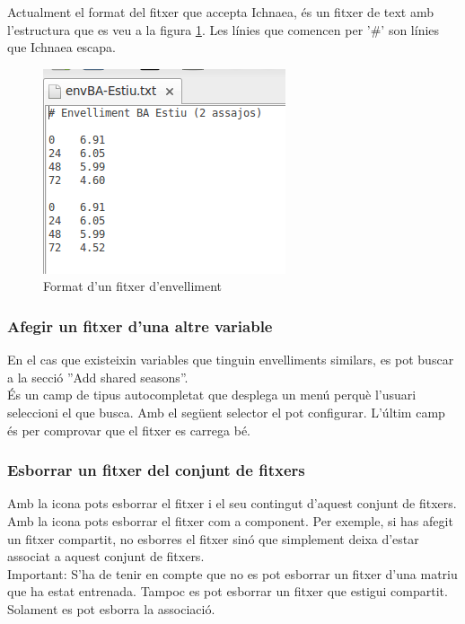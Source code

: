 Actualment el format del fitxer que accepta Ichnaea, \'{e}s un fitxer de text amb l'estructura que es veu a la figura \ref{fig:envelliment}. Les línies que comencen per '\#' son línies que Ichnaea escapa.

\begin{figure}[h!]
  \centering
  \includegraphics[scale=0.5]{img/userguide/envelliment.png}
  \caption{Format d'un fitxer d'envelliment}
  \label{fig:envelliment}
\end{figure}

\subsubsection{Afegir un fitxer d'una altre variable}
En el cas que existeixin variables que tinguin envelliments similars, es pot buscar a la secció ''Add shared seasons''.\\

\'{E}s un camp de tipus autocompletat que desplega un menú perquè l'usuari seleccioni el que busca. Amb el següent selector el pot configurar. L'\'{u}ltim camp \'{e}s per comprovar que el fitxer es carrega b\'{e}.

\subsubsection{Esborrar un fitxer del conjunt de fitxers}
Amb la icona \icontrash pots esborrar el fitxer i el seu contingut d'aquest conjunt de fitxers.\\

Amb la icona \iconremove pots esborrar el fitxer com a component. Per exemple, si has afegit un fitxer compartit, no esborres el fitxer sinó que simplement deixa d'estar associat a aquest conjunt de fitxers.\\

Important: S'ha de tenir en compte que no es pot esborrar un fitxer d'una matriu que ha estat entrenada. Tampoc es pot esborrar un fitxer que estigui compartit. Solament es pot esborra la associació.
